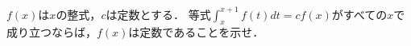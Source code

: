 \documentclass[../../main.tex]{subfiles}
\begin{document}
$f(x)$は$x$の整式，$c$は定数とする．
等式$\displaystyle\int_x^{x+1}f(t)dt=cf(x)$がすべての$x$で成り立つならば，$f(x)$は定数であることを示せ．
\end{document}
